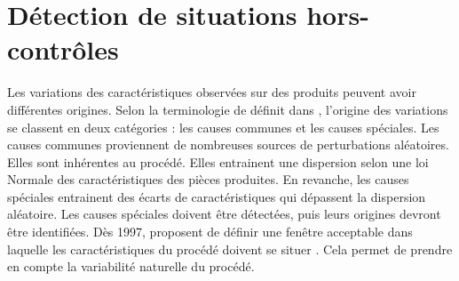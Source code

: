 \section{Détection de situations hors-contrôles} \label{subsubsec:spc}
Les variations des caractéristiques observées sur des produits peuvent avoir différentes origines.
Selon la terminologie de \citeauthor{shewhart_economic_1930} définit dans  \cite{shewhart_economic_1930}, l'origine des variations se classent en deux catégories : les causes communes et les causes spéciales.
Les causes communes proviennent de nombreuses sources de perturbations aléatoires.
Elles sont inhérentes au procédé.
Elles entrainent une dispersion selon une loi Normale des caractéristiques des pièces produites.
En revanche, les causes spéciales entrainent des écarts de caractéristiques qui dépassent la dispersion aléatoire.
Les causes spéciales doivent être détectées, puis leurs origines devront être identifiées.
Dès 1997, \citeauthor{sherbelis_methods_1997} proposent de définir une fenêtre acceptable dans laquelle les caractéristiques du procédé doivent se situer \cite{sherbelis_methods_1997}.
Cela permet de prendre en compte la variabilité naturelle du procédé.

